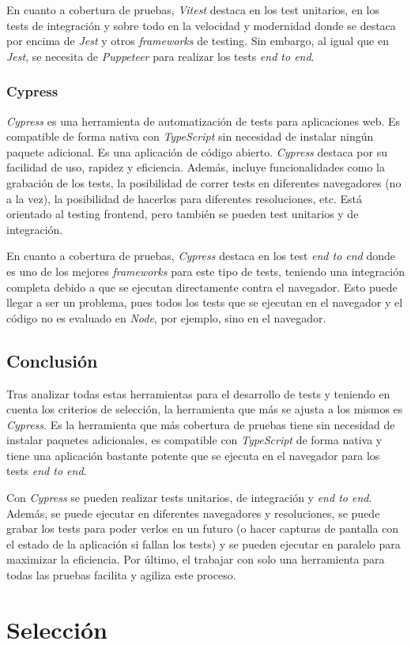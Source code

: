 En cuanto a cobertura de pruebas, \textit{Vitest} destaca en los test unitarios, en los tests de integración y sobre todo en la velocidad y modernidad donde se destaca por encima de \textit{Jest} y otros \textit{frameworks} de testing. Sin embargo, al igual que en \textit{Jest}, se necesita de \textit{Puppeteer} para realizar los tests \textit{end to end}.

\subsubsection{Cypress}

\textit{Cypress} es una herramienta de automatización de tests para aplicaciones web. Es compatible de forma nativa con \textit{TypeScript} sin necesidad de instalar ningún paquete adicional. Es una aplicación de código abierto. \textit{Cypress} destaca por su facilidad de uso, rapidez y eficiencia. Además, incluye funcionalidades como la grabación de los tests, la posibilidad de correr tests en diferentes navegadores (no a la vez), la posibilidad de hacerlos para diferentes resoluciones, etc. Está orientado al testing frontend, pero también se pueden test unitarios y de integración.

En cuanto a cobertura de pruebas, \textit{Cypress} destaca en los test \textit{end to end} donde es uno de los mejores \textit{frameworks} para este tipo de tests, teniendo una integración completa debido a que se ejecutan directamente contra el navegador. Esto puede llegar a ser un problema, pues todos los tests que se ejecutan en el navegador y el código no es evaluado en \textit{Node}, por ejemplo, sino en el navegador.

\subsection{Conclusión}

Tras analizar todas estas herramientas para el desarrollo de tests y teniendo en cuenta los criterios de selección, la herramienta que más se ajusta a los mismos es \textit{Cypress}. Es la herramienta que más cobertura de pruebas tiene sin necesidad de instalar paquetes adicionales, es compatible con \textit{TypeScript} de forma nativa y tiene una aplicación bastante potente que se ejecuta en el navegador para los tests \textit{end to end}.

Con \textit{Cypress} se pueden realizar tests unitarios, de integración y \textit{end to end}. Además, se puede ejecutar en diferentes navegadores y resoluciones, se puede grabar los tests para poder verlos en un futuro (o hacer capturas de pantalla con el estado de la aplicación si fallan los tests) y se pueden ejecutar en paralelo para maximizar la eficiencia. Por último, el trabajar con solo una herramienta para todas las pruebas facilita y agiliza este proceso.

\section{Selección }